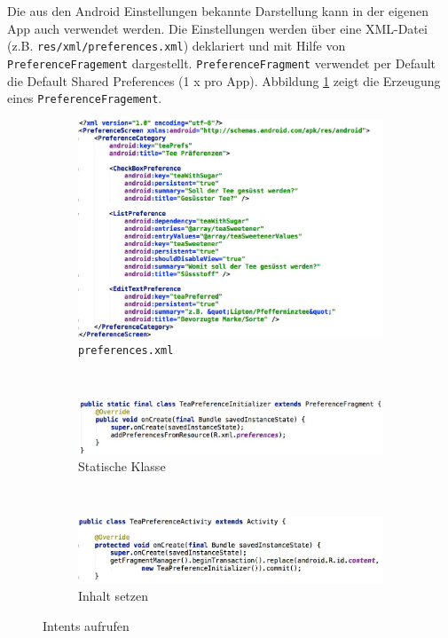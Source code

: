 Die aus den Android Einstellungen bekannte Darstellung kann in der eigenen App auch verwendet werden. Die Einstellungen werden über eine XML-Datei (z.B. \texttt{res/xml/preferences.xml}) deklariert und mit Hilfe von \texttt{PreferenceFragement} dargestellt. \texttt{PreferenceFragment} verwendet per Default die Default Shared Preferences (1 x pro App). Abbildung \ref{fig:preference-fragment} zeigt die Erzeugung eines \texttt{PreferenceFragement}.
\begin{figure}
	\centering
	\begin{subfigure}[b]{0.3\textwidth}
		\includegraphics[width=\textwidth]{fig/preference-fragment-xml}
		\caption{\texttt{preferences.xml}}
	\end{subfigure}
	~
	\begin{subfigure}[b]{0.3\textwidth}
		\includegraphics[width=\textwidth]{fig/preference-fragment-static}
		\caption{Statische Klasse}
	\end{subfigure}
	~
	\begin{subfigure}[b]{0.3\textwidth}
		\includegraphics[width=\textwidth]{fig/preference-fragment-activity}
		\caption{Inhalt setzen}
	\end{subfigure}
	\caption{Intents aufrufen}
	\label{fig:preference-fragment}
\end{figure}

